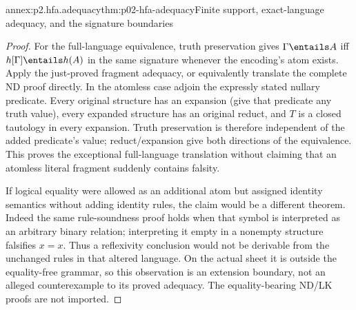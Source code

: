 \begin{annexitem}{annex:p2.hfa.adequacy}{thm:p02-hfa-adequacy}{Finite support, exact-language adequacy, and the signature boundaries}
\begin{proof}
For the full-language equivalence, truth preservation gives
\(\Gamma\entails A\) iff \(h[\Gamma]\entails h(A)\) in the
same signature whenever the encoding's atom exists. Apply the
just-proved fragment adequacy, or equivalently translate the complete
ND proof directly. In the atomless case adjoin the expressly stated
nullary predicate. Every original structure has an expansion (give
that predicate any truth value), every expanded structure has an
original reduct, and \(T\) is a closed tautology in every expansion.
Truth preservation is therefore independent of the added predicate's
value; reduct/expansion give both directions of the equivalence.
This proves the exceptional full-language translation without claiming
that an atomless literal fragment suddenly contains falsity.

If logical equality were allowed as an additional atom but assigned
identity semantics without adding identity rules, the claim would
be a different theorem. Indeed the same rule-soundness proof holds
when that symbol is interpreted as an arbitrary binary relation;
interpreting it empty in a nonempty structure falsifies \(x=x\).
Thus a reflexivity conclusion would not be derivable from the
unchanged rules in that altered language. On the actual sheet it
is outside the equality-free grammar, so this observation is an
extension boundary, not an alleged counterexample to its proved
adequacy. The equality-bearing ND/LK proofs are not imported.
\end{proof}
\end{annexitem}

